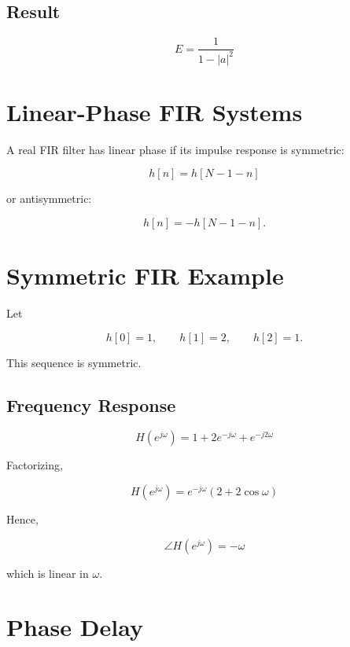 
\subsection{Result}

\[
\boxed{
E=\frac{1}{1-|a|^2}
}
\]


\section{Linear-Phase FIR Systems}

A real FIR filter has linear phase if its impulse response is symmetric:

\[
\boxed{
h[n]=h[N-1-n]
}
\]

or antisymmetric:

\[
\boxed{
h[n]=-h[N-1-n].
}
\]


\section{Symmetric FIR Example}

Let

\[
h[0]=1,\qquad h[1]=2,\qquad h[2]=1.
\]

This sequence is symmetric.


\subsection{Frequency Response}

\[
H(e^{j\omega})=
1+2e^{-j\omega}+e^{-j2\omega}
\]

Factorizing,

\[
H(e^{j\omega})=
e^{-j\omega}
\left(
2+2\cos\omega
\right)
\]

Hence,

\[
\boxed{
\angle H(e^{j\omega})=-\omega
}
\]

which is linear in \(\omega\).


\section{Phase Delay}

